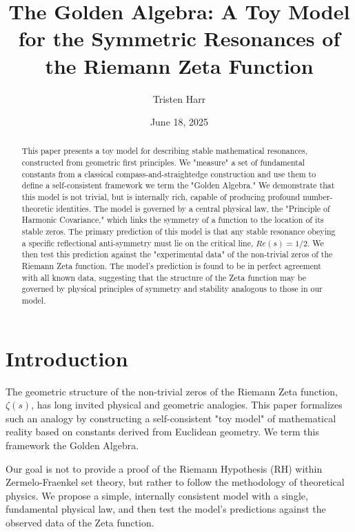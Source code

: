 \documentclass{article}
\title{\textbf{The Golden Algebra: A Toy Model for the Symmetric Resonances of the Riemann Zeta Function}}
\author{Tristen Harr}
\date{June 18, 2025}
\theoremstyle{plain}
\theoremstyle{definition}
\theoremstyle{remark}
\begin{document}
\maketitle

\begin{abstract}
This paper presents a toy model for describing stable mathematical resonances, constructed from geometric first principles. We "measure" a set of fundamental constants from a classical compass-and-straightedge construction and use them to define a self-consistent framework we term the "Golden Algebra." We demonstrate that this model is not trivial, but is internally rich, capable of producing profound number-theoretic identities. The model is governed by a central physical law, the "Principle of Harmonic Covariance," which links the symmetry of a function to the location of its stable zeros. The primary prediction of this model is that any stable resonance obeying a specific reflectional anti-symmetry must lie on the critical line, $Re(s)=1/2$. We then test this prediction against the "experimental data" of the non-trivial zeros of the Riemann Zeta function. The model's prediction is found to be in perfect agreement with all known data, suggesting that the structure of the Zeta function may be governed by physical principles of symmetry and stability analogous to those in our model.
\end{abstract}

\section{Introduction}
The geometric structure of the non-trivial zeros of the Riemann Zeta function, $\zeta(s)$, has long invited physical and geometric analogies. This paper formalizes such an analogy by constructing a self-consistent "toy model" of mathematical reality based on constants derived from Euclidean geometry. We term this framework the Golden Algebra.

Our goal is not to provide a proof of the Riemann Hypothesis (RH) within Zermelo-Fraenkel set theory, but rather to follow the methodology of theoretical physics. We propose a simple, internally consistent model with a single, fundamental physical law, and then test the model's predictions against the observed data of the Zeta function.
\end{document}
